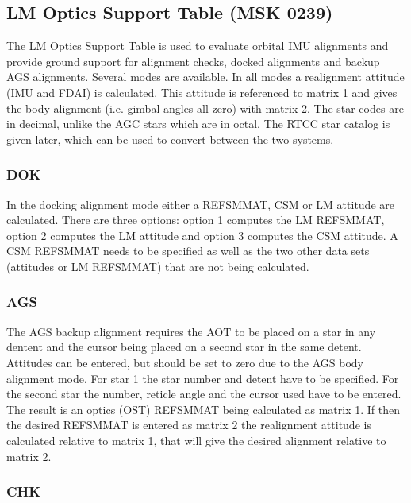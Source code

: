\documentclass[11pt]{article} %
\begin{document}
\subsection{LM Optics Support Table (MSK 0239)}

The LM Optics Support Table is used to evaluate orbital IMU alignments and provide ground support for alignment checks, docked alignments and backup AGS alignments. Several modes are available. In all modes a realignment attitude (IMU and FDAI) is calculated. This attitude is referenced to matrix 1 and gives the body alignment (i.e. gimbal angles all zero) with matrix 2. The star codes are in decimal, unlike the AGC stars which are in octal. The RTCC star catalog is given later, which can be used to convert between the two systems.\\

\subsubsection{DOK}

In the docking alignment mode either a REFSMMAT, CSM or LM attitude are calculated. There are three options: option 1 computes the LM REFSMMAT, option 2 computes the LM attitude and option 3 computes the CSM attitude. A CSM REFSMMAT needs to be specified as well as the two other data sets (attitudes or LM REFSMMAT) that are not being calculated.\\

\subsubsection{AGS}

The AGS backup alignment requires the AOT to be placed on a star in any dentent and the cursor being placed on a second star in the same detent. Attitudes can be entered, but should be set to zero due to the AGS body alignment mode. For star 1 the star number and detent have to be specified. For the second star the number, reticle angle and the cursor used have to be entered. The result is an optics (OST) REFSMMAT being calculated as matrix 1. If then the desired REFSMMAT is entered as matrix 2 the realignment attitude is calculated relative to matrix 1, that will give the desired alignment relative to matrix 2.\\

\subsubsection{CHK}
\end{document}
